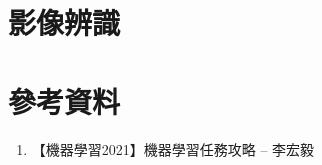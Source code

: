 


\section{影像辨識}











\section*{參考資料} 

\begin{enumerate}
  \item 【機器學習2021】機器學習任務攻略 -- 李宏毅
\end{enumerate}
